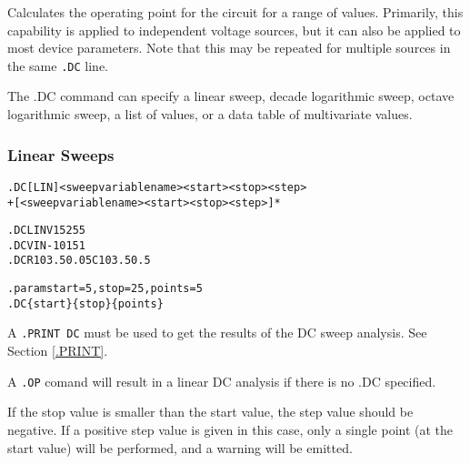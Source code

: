 


Calculates the operating point for the circuit for a
range of values.  Primarily, this capability is applied to independent
voltage sources, but it can also be applied to most device parameters.
Note that this may be repeated for multiple sources in the
same \texttt{.DC} line.

The .DC command can specify a linear sweep, decade logarithmic sweep,
octave logarithmic sweep, a list of values, or a data table of multivariate values.

\subsubsection{Linear Sweeps}
 

\begin{Command}
\format
\begin{alltt}
.DC [LIN] <sweep variable name> <start> <stop> <step>
+ [<sweep variable name> <start> <stop> <step>]*
\end{alltt}

\examples
\begin{alltt}
.DC LIN V1 5 25 5
.DC VIN -10 15 1
.DC R1 0 3.5 0.05 C1 0 3.5 0.5

.param start=5, stop=25, points=5
.DC \{start\} \{stop\} \{points\} 
\end{alltt}

\comments
A \texttt{.PRINT DC} must be used to get the results of the DC sweep
analysis.  See Section \ref{.PRINT}.

A \texttt{.OP} comand will result in a linear DC analysis if there is no .DC specified.

If the stop value is smaller than the start value, the step value
should be negative.  If a positive step value is given in this case,
only a single point (at the start value) will be performed, and a
warning will be emitted.

\end{Command}

